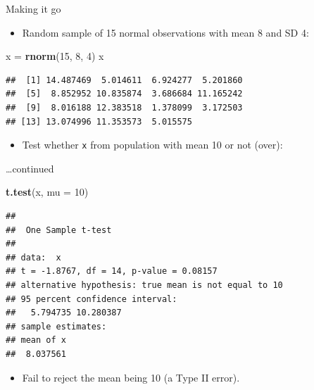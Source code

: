 \documentclass[
  ignorenonframetext,
]{beamer}
\newenvironment{Shaded}{\begin{snugshade}}{\end{snugshade}}
\newcommand{\DataTypeTok}[1]{\textcolor[rgb]{0.13,0.29,0.53}{#1}}
\newcommand{\DecValTok}[1]{\textcolor[rgb]{0.00,0.00,0.81}{#1}}
\newcommand{\KeywordTok}[1]{\textcolor[rgb]{0.13,0.29,0.53}{\textbf{#1}}}
\newcommand{\NormalTok}[1]{#1}
\newcommand{\StringTok}[1]{\textcolor[rgb]{0.31,0.60,0.02}{#1}}
\providecommand{\tightlist}{%
  \setlength{\itemsep}{0pt}\setlength{\parskip}{0pt}}
\begin{document}
\begin{frame}[fragile]{Making it go}
\protect\hypertarget{making-it-go}{}

\begin{itemize}
\tightlist
\item
  Random sample of 15 normal observations with mean 8 and SD 4:
\end{itemize}

\begin{Shaded}
\begin{Highlighting}[]
\NormalTok{x =}\StringTok{ }\KeywordTok{rnorm}\NormalTok{(}\DecValTok{15}\NormalTok{, }\DecValTok{8}\NormalTok{, }\DecValTok{4}\NormalTok{)}
\NormalTok{x}
\end{Highlighting}
\end{Shaded}

\begin{verbatim}
##  [1] 14.487469  5.014611  6.924277  5.201860
##  [5]  8.852952 10.835874  3.686684 11.165242
##  [9]  8.016188 12.383518  1.378099  3.172503
## [13] 13.074996 11.353573  5.015575
\end{verbatim}

\begin{itemize}
\tightlist
\item
  Test whether \texttt{x} from population with mean 10 or not (over):
\end{itemize}

\end{frame}

\begin{frame}[fragile]{\ldots continued}
\protect\hypertarget{continued}{}

\begin{Shaded}
\begin{Highlighting}[]
\KeywordTok{t.test}\NormalTok{(x, }\DataTypeTok{mu =} \DecValTok{10}\NormalTok{)}
\end{Highlighting}
\end{Shaded}

\begin{verbatim}
## 
##  One Sample t-test
## 
## data:  x
## t = -1.8767, df = 14, p-value = 0.08157
## alternative hypothesis: true mean is not equal to 10
## 95 percent confidence interval:
##   5.794735 10.280387
## sample estimates:
## mean of x 
##  8.037561
\end{verbatim}

\begin{itemize}
\tightlist
\item
  Fail to reject the mean being 10 (a Type II error).
\end{itemize}

\end{frame}
\end{document}
